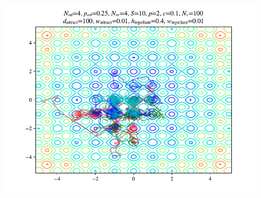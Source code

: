 \documentclass{beamer}
\begin{document}
\begin{frame}
\begin{columns}[T]
\begin{center}
    \includegraphics[scale=0.3]{assets/rastrigin_colony_ed_1_theta}
  \end{center}
\end{columns}
\end{frame}
\end{document}
